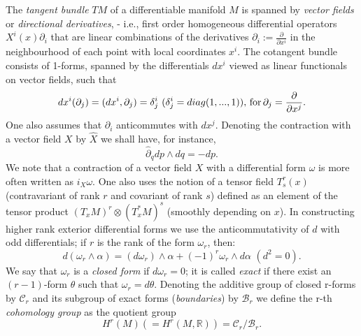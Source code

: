 \documentclass[12pt]{article}
\begin{document}
The {\it tangent bundle} $TM$ of a differentiable manifold $M$ is spanned by
{\it vector fields} or {\it directional derivatives}, - i.e., first order
homogeneous differential operators $X^i(x)\partial_i$ that are linear
combinations of the derivatives $\partial_i:= \frac{\partial}{\partial x^i}$ in
 the neighbourhood of each point with local coordinates $x^i$. The cotangent
bundle consists of 1-forms, spanned by the differentials $dx^i$ viewed as
linear functionals on vector fields, such that
\begin{equation}
\label{dx}
dx^i(\partial_j) = (dx^i, \partial_j) = \delta^i_j \, \, (\delta^i_j =
diag(1, ..., 1)), \, {\rm for} \, \partial_j = \frac{\partial}{\partial x^j}.
\end{equation}
One also assumes that $\partial_i$ anticommutes with $dx^j$. Denoting the
contraction with a vector field $X$ by ${\hat X}$ we shall have, for instance,
\begin{equation}
{\hat \partial}_q dp\wedge dq = - dp.
\end{equation}
We note that a contraction of a vector field $X$ with a differential form
$\omega$ is more often written as $i_X \omega$. One also uses the notion of a
tensor field $T^r_s(x)$ (contravariant of rank $r$ and covariant of rank $s$)
defined as an element of the tensor product $(T_x M)^r\otimes(T^*_x M)^s$
(smoothly depending on $x$). In constructing higher rank exterior differential
forms we use the anticommutativity of $d$ with odd differentials; if $r$ is the
rank of the form $\omega_r$, then:
\begin{equation}
\label{d^2}
d(\omega_r\wedge\alpha) = (d\omega_r)\wedge\alpha + (-1)^r\omega_r \wedge d\alpha \, \, (d^2 = 0).
\end{equation}
We say that $\omega_r$ is a {\it closed form} if $d\omega_r = 0$; it is called
{\it exact} if there exist an $(r-1)$-form $\theta$ such that $\omega_r = d\theta$.
Denoting the additive group of closed r-forms by ${\mathcal C}_r$ and its subgroup of
exact forms ({\it boundaries}) by ${\mathcal B}_r$ we define the r-th {\it cohomology
group} as the quotient group
\begin{equation}
\label{Hr}
H^r(M) (=H^r(M, {\mathbb R})) = {\mathcal C}_r /{\mathcal B}_r.
\end{equation}
\end{document}
